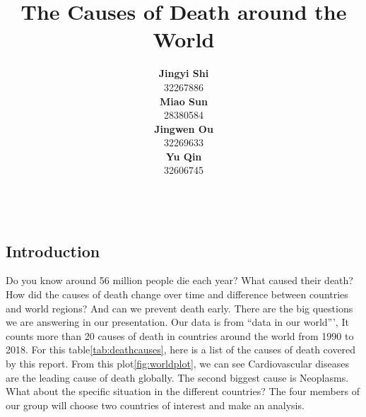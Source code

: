 \documentclass[11pt,a4paper,]{article}
\title{The Causes of Death around the World}
\author{\sf\Large\textbf{ Jingyi Shi}\\ {\sf\large 32267886\\[0.5cm]} \sf\Large\textbf{ Miao Sun}\\ {\sf\large 28380584\\[0.5cm]} \sf\Large\textbf{ Jingwen Ou}\\ {\sf\large 32269633\\[0.5cm]} \sf\Large\textbf{ Yu Qin}\\ {\sf\large 32606745\\[0.5cm]}}
\date{\sf\Date~\Month~\Year}
\makeatletter
\def\titlepage{\front{\expandafter{\@title}}{\@author}{\@organization}}
\makeatother
\begin{document}
\titlepage

\clearpage

\hypertarget{introduction}{%
\subsection{Introduction}\label{introduction}}

Do you know around 56 million people die each year? What caused their death? How did the causes of death change over time and difference between countries and world regions? And can we prevent death early. There are the big questions we are answering in our presentation. Our data is from ``data in our world''', It counts more than 20 causes of death in countries around the world from 1990 to 2018. For this table\ref{tab:deathcauses}, here is a list of the causes of death covered by this report. From this plot\ref{fig:worldplot}, we can see Cardiovascular diseases are the leading cause of death globally. The second biggest cause is Neoplasms. What about the specific situation in the different countries? The four members of our group will choose two countries of interest and make an analysis.
\end{document}
